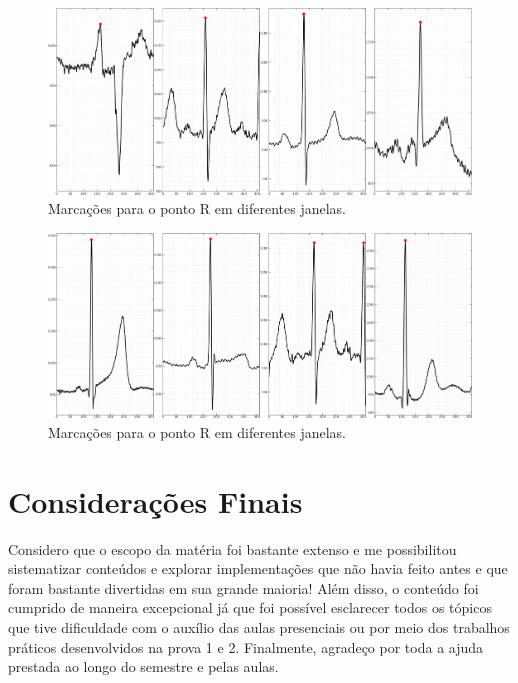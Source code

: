 \documentclass{article}
\begin{document}
\begin{figure}[H]
	\begin{center}
		\includegraphics[scale=0.3]{../Q2_d.png}
		\caption{Marcações para o ponto R em diferentes janelas.}
		\label{fig:Q2_d}
	\end{center}
\end{figure}  

\begin{figure}[H]
	\begin{center}
		\includegraphics[scale=0.3]{../Q2_d2.png}
		\caption{Marcações para o ponto R em diferentes janelas.}
		\label{fig:Q2_d2}
	\end{center}
\end{figure} 

\newpage
\section*{Considerações Finais}
Considero que o escopo da matéria foi bastante extenso e me possibilitou sistematizar conteúdos e explorar implementações que não havia feito antes e que foram bastante divertidas em sua grande maioria! Além disso, o conteúdo foi cumprido de maneira excepcional já que foi possível esclarecer todos os tópicos que tive dificuldade com o auxílio das aulas presenciais ou por meio dos trabalhos práticos desenvolvidos na prova 1 e 2. Finalmente, agradeço por toda a ajuda prestada ao longo do semestre e pelas aulas.
\end{document}
